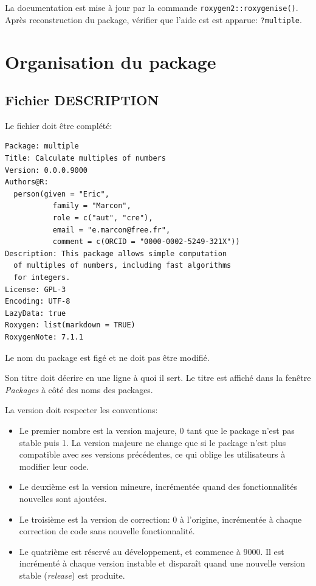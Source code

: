\documentclass[
  12pt,
  french,
  a4paper,
  extrafontsizes,onecolumn,openright
  ]{memoir}
\providecommand{\tightlist}{%
  \setlength{\itemsep}{0pt}\setlength{\parskip}{0pt}}
\begin{document}
La documentation est mise à jour par la commande \texttt{roxygen2::roxygenise()}.
Après reconstruction du package, vérifier que l'aide est est apparue: \texttt{?multiple}.

\hypertarget{organisation-du-package}{%
\section{Organisation du package}\label{organisation-du-package}}

\hypertarget{sec:package-description}{%
\subsection{Fichier DESCRIPTION}\label{sec:package-description}}

Le fichier doit être complété:

\begin{verbatim}
Package: multiple
Title: Calculate multiples of numbers
Version: 0.0.0.9000
Authors@R: 
  person(given = "Eric",
           family = "Marcon",
           role = c("aut", "cre"),
           email = "e.marcon@free.fr",
           comment = c(ORCID = "0000-0002-5249-321X"))
Description: This package allows simple computation
  of multiples of numbers, including fast algorithms
  for integers.
License: GPL-3
Encoding: UTF-8
LazyData: true
Roxygen: list(markdown = TRUE)
RoxygenNote: 7.1.1
\end{verbatim}

Le nom du package est figé et ne doit pas être modifié.

Son titre doit décrire en une ligne à quoi il sert.
Le titre est affiché dans la fenêtre \emph{Packages} à côté des noms des packages.

La version doit respecter les conventions:

\begin{itemize}
\tightlist
\item
  Le premier nombre est la version majeure, 0 tant que le package n'est pas stable puis 1.
  La version majeure ne change que si le package n'est plus compatible avec ses versions précédentes, ce qui oblige les utilisateurs à modifier leur code.
\item
  Le deuxième est la version mineure, incrémentée quand des fonctionnalités nouvelles sont ajoutées.
\item
  Le troisième est la version de correction: 0 à l'origine, incrémentée à chaque correction de code sans nouvelle fonctionnalité.
\item
  Le quatrième est réservé au développement, et commence à 9000.
  Il est incrémenté à chaque version instable et disparaît quand une nouvelle version stable (\emph{release}) est produite.
\end{itemize}
\end{document}
